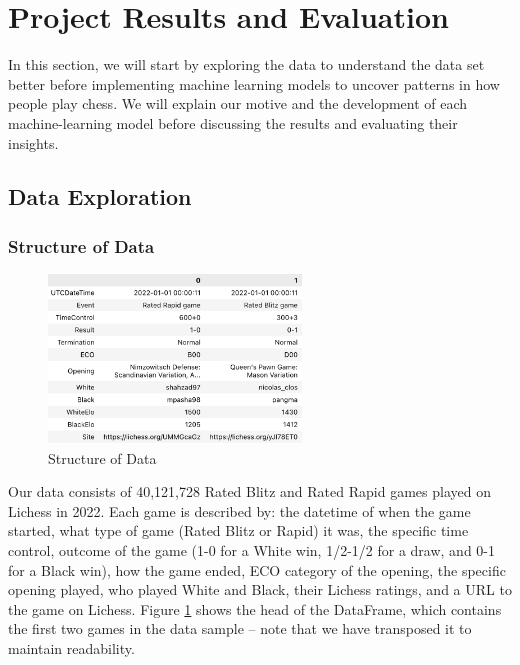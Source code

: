 \documentclass[a4paper, 11pt]{article}
\begin{document}
\section{Project Results and Evaluation}
In this section, we will start by exploring the data to understand the data set better before implementing machine learning models to uncover patterns in how people play chess. We will explain our motive and the development of each machine-learning model before discussing the results and evaluating their insights.

\subsection{Data Exploration}

\subsubsection{Structure of Data}

\begin{figure}[H]
    \centering
    \caption{Structure of Data}
    \label{fig:structureOfData}
    \includegraphics[width=0.6\textwidth]{Structure of Data Transposed.png}
\end{figure}

Our data consists of 40,121,728 Rated Blitz and Rated Rapid games played on Lichess in 2022. Each game is described by: the datetime of when the game started, what type of game (Rated Blitz or Rapid) it was, the specific time control, outcome of the game (1-0 for a White win, 1/2-1/2 for a draw, and 0-1 for a Black win), how the game ended, ECO category of the opening, the specific opening played, who played White and Black, their Lichess ratings, and a URL to the game on Lichess. Figure \ref{fig:structureOfData} shows the head of the DataFrame, which contains the first two games in the data sample -- note that we have transposed it to maintain readability.
\end{document}
